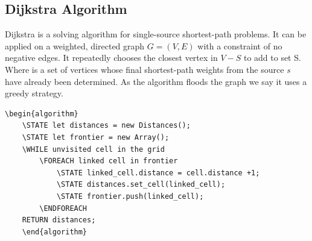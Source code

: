 \subsection{Dijkstra Algorithm}
Dijkstra is a solving algorithm for single-source shortest-path problems. It can be applied on a weighted, directed graph $G=(V, E)$ with a constraint of no negative edges. 
It repeatedly chooses the closest vertex in $V-S$ to add to set S. 
Where  is a set of vertices whose final shortest-path weights from the source \textit{s} have already been determined.
As the algorithm floods the graph we say it uses a greedy strategy.
\begin{lstlisting}[caption={Pseudocode for a Dijkstra's algorithm}]
	\begin{algorithm}
	\STATE let distances = new Distances();
	\STATE let frontier = new Array();
	\WHILE unvisited cell in the grid
		\FOREACH linked cell in frontier
			\STATE linked_cell.distance = cell.distance +1;
			\STATE distances.set_cell(linked_cell);
			\STATE frontier.push(linked_cell);
	    \ENDFOREACH
	RETURN distances;
	\end{algorithm}
	\end{lstlisting}
